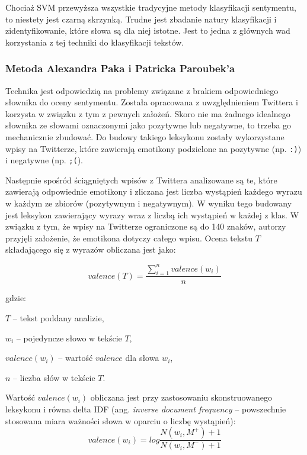 Chociaż SVM przewyższa wszystkie tradycyjne metody klasyfikacji sentymentu,
to niestety jest czarną skrzynką. Trudne jest zbadanie natury klasyfikacji i
zidentyfikowanie, które słowa są dla niej istotne. Jest to jedna z głównych wad
korzystania z tej techniki do klasyfikacji tekstów. 

\subsubsection{Metoda Alexandra Paka i Patricka Paroubek'a}
\label{subsubsection:pakandparoubek}
Technika jest odpowiedzią na problemy związane z brakiem odpowiedniego słownika
do oceny sentymentu. Została opracowana z uwzględnieniem Twittera i korzysta
w związku z tym z pewnych założeń. Skoro nie ma żadnego idealnego słownika
ze słowami oznaczonymi jako pozytywne lub negatywne, to trzeba go mechanicznie
zbudować. Do budowy takiego leksykonu zostały wykorzystane wpisy na Twitterze,
które zawierają emotikony podzielone na pozytywne (np. \texttt{:)}) i 
negatywne (np. \texttt{;(}). 

Następnie spośród ściągniętych wpisów z Twittera analizowane są te,
które zawierają odpowiednie emotikony i zliczana jest liczba wystąpień
każdego wyrazu w każdym ze zbiorów (pozytywnym i negatywnym).
W wyniku tego budowany jest leksykon zawierający wyrazy wraz z liczbą
ich wystąpień w każdej z klas.
W związku z tym, że wpisy na Twitterze ograniczone są do 140 znaków, autorzy przyjęli
założenie, że emotikona dotyczy całego wpisu. 
Ocena tekstu $T$ składającego się z wyrazów obliczana jest jako:

\begin{equation}
valence(T) = \frac{\sum\limits_{i = 1}^n valence(w_i)}{n}
\label{equation:pakparoubek}
\end{equation}

gdzie:

$T$ -- tekst poddany analizie,

$w_i$ -- pojedyncze słowo w tekście $T$,

$valence(w_i)$ -- wartość $valence$ dla słowa $w_i$,

$n$ -- liczba słów w tekście $T$.

\bigskip


Wartość $valence(w_i)$ obliczana jest przy zastosowaniu skonstruowanego
leksykonu i równa delta IDF (ang. \textit{inverse document frequency} -- 
powszechnie stosowana miara ważności słowa w oparciu o liczbę wystąpień):
\begin{equation}
valence(w_i) = log\frac{N(w_i, M^+) + 1}{N(w_i, M^-) + 1}
\end{equation} 

